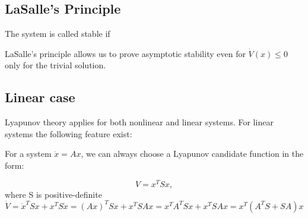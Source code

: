 \subsection{LaSalle's Principle}
The system is called stable if 


LaSalle's principle allows us to prove asymptotic stability even for $\dot{V}(x) \leq 0$ only for the trivial solution.


\subsection{Linear case}
Lyapunov theory applies for both nonlinear and linear systems. 
For linear systems the following feature exist:

For a system $\dot x = Ax$, we can always choose a Lyapunov candidate function in the form:

\[V = x^TSx, \] where S is positive-definite
\[\dot V = \dot x^T S x + x^T S \dot x = (Ax)^T Sx + x^TSAx = x^TA^TSx + x^TSAx = x^T (A^TS+SA) x\]


